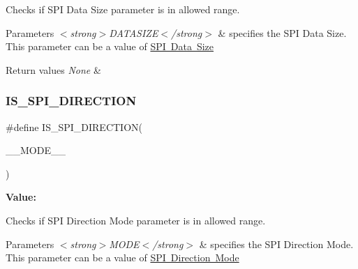 Checks if S\+PI Data Size parameter is in allowed range. 


\begin{DoxyParams}{Parameters}
{\em $<$strong$>$\+D\+A\+T\+A\+S\+I\+Z\+E$<$/strong$>$} & specifies the S\+PI Data Size. This parameter can be a value of \mbox{\hyperlink{group___s_p_i___data___size}{S\+PI Data Size}} \\
\hline
\end{DoxyParams}

\begin{DoxyRetVals}{Return values}
{\em None} & \\
\hline
\end{DoxyRetVals}
\mbox{\label{group___s_p_i___private___macros_ga6c66285d42fc3baf5ecaceadb54ee42a}} 
\subsubsection{\texorpdfstring{IS\_SPI\_DIRECTION}{IS\_SPI\_DIRECTION}}
{\footnotesize\ttfamily \#define I\+S\+\_\+\+S\+P\+I\+\_\+\+D\+I\+R\+E\+C\+T\+I\+ON(\begin{DoxyParamCaption}\item[{}]{\+\_\+\+\_\+\+M\+O\+D\+E\+\_\+\+\_\+ }\end{DoxyParamCaption})}

{\bfseries Value\+:}
\begin{DoxyCode}{0}

\end{DoxyCode}


Checks if S\+PI Direction Mode parameter is in allowed range. 


\begin{DoxyParams}{Parameters}
{\em $<$strong$>$\+M\+O\+D\+E$<$/strong$>$} & specifies the S\+PI Direction Mode. This parameter can be a value of \mbox{\hyperlink{group___s_p_i___direction}{S\+PI Direction Mode}} \\
\hline
\end{DoxyParams}

